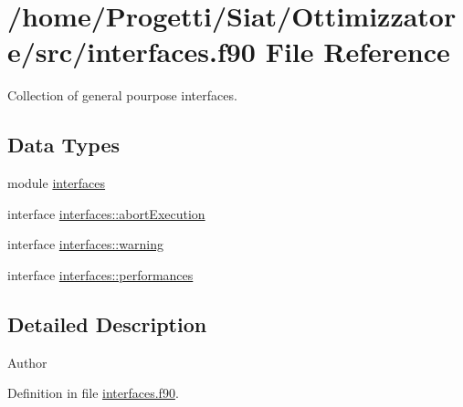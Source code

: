 \hypertarget{interfaces_8f90}{\section{/home/\-Progetti/\-Siat/\-Ottimizzatore/src/interfaces.f90 File Reference}
\label{interfaces_8f90}
}


Collection of general pourpose interfaces.  


\subsection*{Data Types}
\begin{DoxyCompactItemize}
\item 
module \hyperlink{classinterfaces}{interfaces}
\item 
interface \hyperlink{interfaceinterfaces_1_1abort_execution}{interfaces\-::abort\-Execution}
\item 
interface \hyperlink{interfaceinterfaces_1_1warning}{interfaces\-::warning}
\item 
interface \hyperlink{interfaceinterfaces_1_1performances}{interfaces\-::performances}
\end{DoxyCompactItemize}


\subsection{Detailed Description}
\begin{DoxyAuthor}{Author}

\end{DoxyAuthor}


Definition in file \hyperlink{interfaces_8f90_source}{interfaces.\-f90}.

